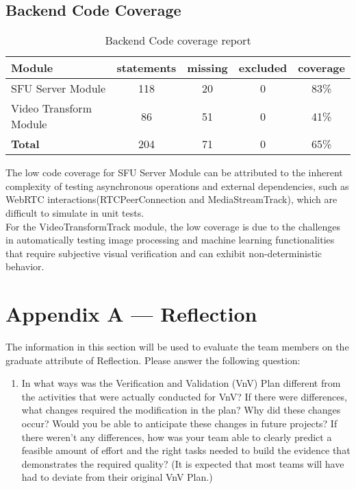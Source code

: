 \documentclass[12pt, titlepage]{article}
\begin{document}
\subsection*{Backend Code Coverage}

\begin{table}[htbp]
  \centering
  \begin{tabular}{@{}lcccc@{}}
  \toprule
  \textbf{Module}                   & \textbf{statements} & \textbf{missing} & \textbf{excluded} & \textbf{coverage} \\ \midrule
  SFU Server Module                 & 118                 & 20               & 0                 & 83\%              \\
  Video Transform Module            & 86                  & 51               & 0                 & 41\%              \\ \midrule
  \textbf{Total}                    & 204                 & 71               & 0                 & 65\%              \\ \bottomrule
  \end{tabular}
  \caption{Backend Code coverage report}
  \label{tab:my-table}
\end{table}
The low code coverage for SFU Server Module can be attributed to the inherent complexity of testing asynchronous operations and external dependencies, such as WebRTC interactions(RTCPeerConnection and MediaStreamTrack), which are difficult to simulate in unit tests.\\
For the VideoTransformTrack module, the low coverage is due to the challenges in automatically testing image processing and machine learning functionalities that require subjective visual verification and can exhibit non-deterministic behavior.

\newpage{}
\section*{Appendix A --- Reflection}

The information in this section will be used to evaluate the team members on the
graduate attribute of Reflection.  Please answer the following question:

\begin{enumerate}
  \item In what ways was the Verification and Validation (VnV) Plan different
  from the activities that were actually conducted for VnV?  If there were
  differences, what changes required the modification in the plan?  Why did
  these changes occur?  Would you be able to anticipate these changes in future
  projects?  If there weren't any differences, how was your team able to clearly
  predict a feasible amount of effort and the right tasks needed to build the
  evidence that demonstrates the required quality?  (It is expected that most
  teams will have had to deviate from their original VnV Plan.)
\end{enumerate}
\end{document}
